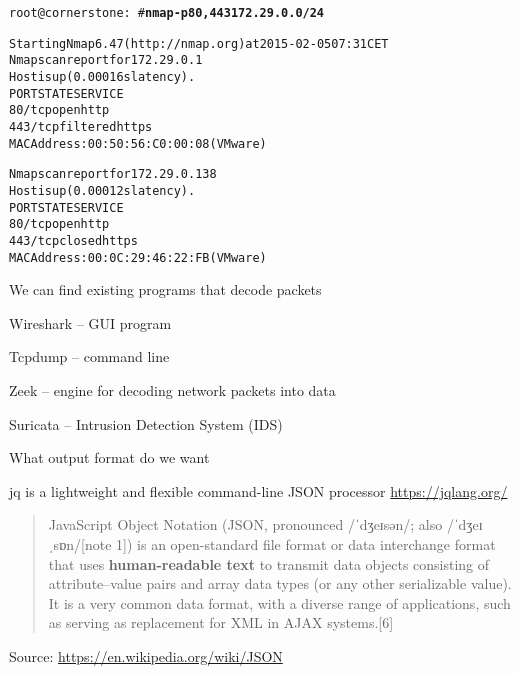 \documentclass[Screen16to9,17pt]{foils}
\begin{document}

\begin{alltt}\small
root@cornerstone:~#{\bfseries  nmap -p80,443 172.29.0.0/24}

Starting Nmap 6.47 ( http://nmap.org ) at 2015-02-05 07:31 CET
Nmap scan report for 172.29.0.1
Host is up (0.00016s latency).
PORT    STATE    SERVICE
{\color{darkgreen}80/tcp  open     http}
443/tcp filtered https
MAC Address: 00:50:56:C0:00:08 (VMware)

Nmap scan report for 172.29.0.138
Host is up (0.00012s latency).
PORT    STATE  SERVICE
{\color{darkgreen}80/tcp  open   http}
443/tcp closed https
MAC Address: 00:0C:29:46:22:FB (VMware)

\end{alltt}




We can find existing programs that decode packets
\begin{list2}
\item Wireshark -- GUI program
\item Tcpdump -- command line
\item Zeek -- engine for decoding network packets into data
\item Suricata -- Intrusion Detection System (IDS)
\end{list2}

What output format do we want


\begin{list2}
\item jq is a lightweight and flexible command-line JSON processor \url{https://jqlang.org/}
\end{list2}



\begin{quote}
JavaScript Object Notation (JSON, pronounced /ˈdʒeɪsən/; also /ˈdʒeɪˌsɒn/[note 1]) is an open-standard file format or data interchange format that uses {\bf human-readable text} to transmit data objects consisting of attribute–value pairs and array data types (or any other serializable value). It is a very common data format, with a diverse range of applications, such as serving as replacement for XML in AJAX systems.[6]
\end{quote}
Source: \url{https://en.wikipedia.org/wiki/JSON}
\end{document}
